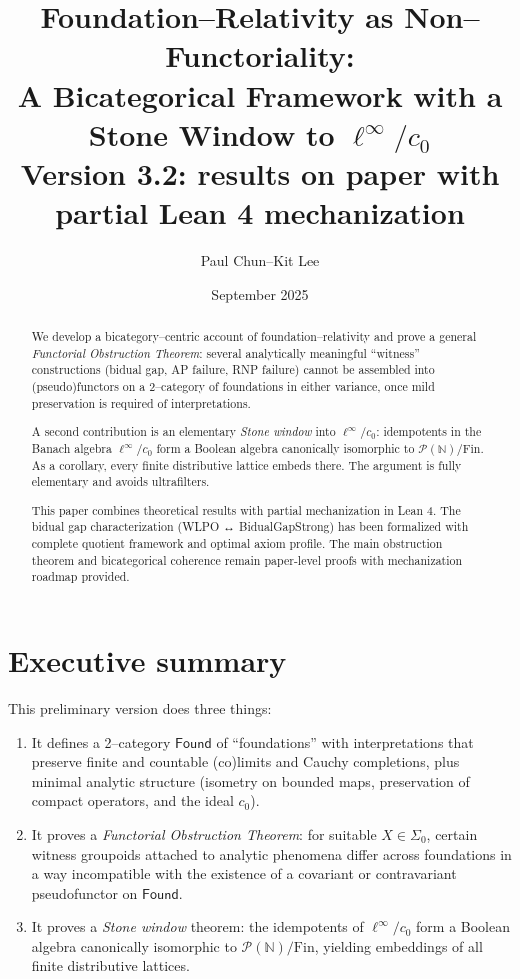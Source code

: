 \documentclass[11pt]{article}
\title{Foundation--Relativity as Non--Functoriality:\\
A Bicategorical Framework with a Stone Window to \(\ell^\infty/c_0\)\\
\large{Version 3.2: results on paper with partial Lean 4 mechanization}}
\author{Paul Chun--Kit Lee}
\date{September 2025}
\theoremstyle{definition}
\theoremstyle{remark}
\newcommand{\Found}{\mathsf{Found}}
\begin{document}
\maketitle

\begin{abstract}
We develop a bicategory--centric account of foundation--relativity and prove a general \emph{Functorial Obstruction Theorem}: several analytically meaningful ``witness'' constructions (bidual gap, AP failure, RNP failure) cannot be assembled into (pseudo)functors on a 2--category of foundations in either variance, once mild preservation is required of interpretations. 

A second contribution is an elementary \emph{Stone window} into \(\ell^\infty/c_0\): idempotents in the Banach algebra \(\ell^\infty/c_0\) form a Boolean algebra canonically isomorphic to \(\mathcal{P}(\mathbb N)/\mathrm{Fin}\). As a corollary, every finite distributive lattice embeds there. The argument is fully elementary and avoids ultrafilters.

This paper combines theoretical results with partial mechanization in Lean 4. The bidual gap characterization (WLPO ↔ BidualGapStrong) has been formalized with complete quotient framework and optimal axiom profile. The main obstruction theorem and bicategorical coherence remain paper-level proofs with mechanization roadmap provided.
\end{abstract}

\tableofcontents

\section{Executive summary}\label{sec:summary}

This preliminary version does three things:

\begin{enumerate}
\item It defines a 2--category \(\Found\) of ``foundations'' with interpretations that preserve finite and countable (co)limits and Cauchy completions, plus minimal analytic structure (isometry on bounded maps, preservation of compact operators, and the ideal \(c_0\)).

\item It proves a \emph{Functorial Obstruction Theorem}: for suitable \(X\in\Sigma_0\), certain witness groupoids attached to analytic phenomena differ across foundations in a way incompatible with the existence of a covariant or contravariant pseudofunctor on \(\Found\).

\item It proves a \emph{Stone window} theorem: the idempotents of \(\ell^\infty/c_0\) form a Boolean algebra canonically isomorphic to \(\mathcal{P}(\mathbb N)/\mathrm{Fin}\), yielding embeddings of all finite distributive lattices.
\end{enumerate}
\end{document}
